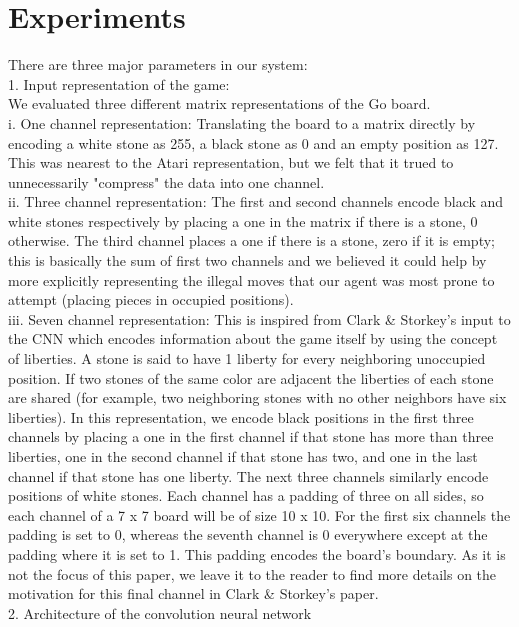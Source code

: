 \section{Experiments}
There are three major parameters in our system:
\\
1. Input representation of the game:
\\
We evaluated three different matrix representations of the Go board.
\\
i. One channel representation: Translating the board to a matrix directly by encoding a white stone as 255, a black stone as 0 and an empty position as 127. This was nearest to the Atari representation, but we felt that it trued to unnecessarily "compress" the data into one channel.
\\ii. Three channel representation: The first and second channels encode black and white stones respectively by placing a one in the matrix if there is a stone, 0 otherwise. The third channel places a one if there is a stone, zero if it is empty; this is basically the sum of first two channels and we believed it could help by more explicitly representing the illegal moves that our agent was most prone to attempt (placing pieces in occupied positions).
\\
iii. Seven channel representation: This is inspired from Clark \& Storkey's input to the CNN which encodes information about the game itself by using the concept of liberties. A stone is said to have 1 liberty for every neighboring unoccupied position. If two stones of the same color are adjacent the liberties of each stone are shared (for example, two neighboring stones with no other neighbors have six liberties). In this representation, we encode black positions in the first three channels by placing a one in the first channel if that stone has more than three liberties, one in the second channel if that stone has two, and one in the last channel if that stone has one liberty. The next three channels similarly encode positions of white stones. Each channel has a padding of three on all sides, so each channel of a 7 x 7 board will be of size 10 x 10. For the first six channels the padding is set to 0, whereas the seventh channel is 0 everywhere except at the padding where it is set to 1. This padding encodes the board's boundary. As it is not the focus of this paper, we leave it to the reader to find more details on the motivation for this final channel in Clark \& Storkey's paper.
\\
2. Architecture of the convolution neural network
